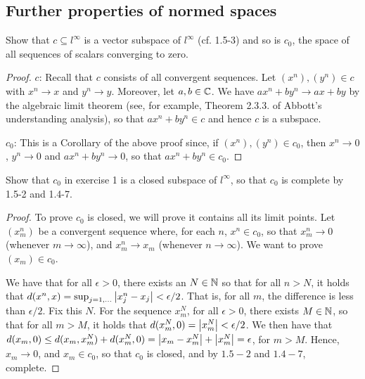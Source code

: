 \subsection{Further properties of normed spaces}


\begin{exercise}{1}
Show that $c\subseteq l^\infty$ is a vector subspace of $l^\infty$ (cf. 1.5-3) and so is $c_0$, the space of all sequences of scalars converging to zero.
\end{exercise}
\begin{proof}
$c$: Recall that $c$ consists of all convergent sequences. Let $(x^n),(y^n)\in c$ with $x^n\to x$ and $y^n\to y$. Moreover, let $a,b\in\mathbb{C}$. We have $ax^n+by^n\to ax+by$ by the algebraic limit theorem (see, for example, Theorem 2.3.3. of Abbott's understanding analysis), so that $ax^n+by^n\in c$ and hence $c$ is a subspace.

$c_0$: This is a Corollary of the above proof since, if $(x^n),(y^n)\in c_0$, then $x^n\to 0$, $y^n\to 0$ and $ax^n+by^n\to 0$, so that $ax^n+by^n\in c_0$.
\end{proof}

\begin{exercise}{2}
Show that $c_0$ in exercise 1 is a closed subspace of $l^\infty$, so that $c_0$ is complete by 1.5-2 and 1.4-7.
\end{exercise}
\begin{proof}
To prove $c_0$ is closed, we will prove it contains all its limit points. Let $(x^n_m)$ be a convergent sequence where, for each $n$, $x^n\in c_0$, so that $x^n_m\to 0$ (whenever $m\to\infty$), and $x^n_m\to x_m$ (whenever $n\to\infty$). We want to prove $(x_m)\in c_0$.

 We have that for all $\epsilon>0$, there exists an $N\in\mathbb{N}$ so that for all $n>N$, it holds that $d(x^n, x)=\sup_{j=1,\dots}\left\lvert x^n_j-x_j\right\rvert<\epsilon/2$. That is, for all $m$, the difference is less than $\epsilon/2$. Fix this $N$. For the sequence $x^N_m$, for all $\epsilon>0$, there exists $M\in\mathbb{N}$, so that for all $m>M$, it holds that $d(x^N_m, 0)=\left\lvert x^N_m\right\rvert<\epsilon/2$. We then have that $d(x_m,0)\leq d(x_m,x^N_m)+d(x^N_m,0)= \left\lvert x_m-x^N_m\right\rvert+\left\lvert x^N_m\right\rvert=\epsilon$, for $m>M$. Hence, $x_m\to 0$, and $x_m\in c_0$, so that $c_0$ is closed, and by $1.5-2$ and $1.4-7$, complete.
\end{proof}

